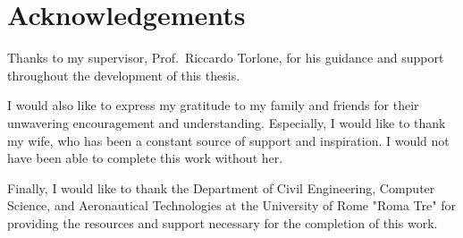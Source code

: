 
\chapter*{Acknowledgements}
\label{sec:acknowledgements}

Thanks to my supervisor, Prof.\ Riccardo Torlone, for his guidance and support throughout the development of this thesis.

I would also like to express my gratitude to my family and friends for their unwavering encouragement and understanding.
Especially, I would like to thank my wife, who has been a constant source of support and inspiration.
I would not have been able to complete this work without her.

Finally, I would like to thank the Department of Civil Engineering, Computer Science, and Aeronautical Technologies at the University of Rome "Roma Tre" for providing the resources and support necessary for the completion of this work.
